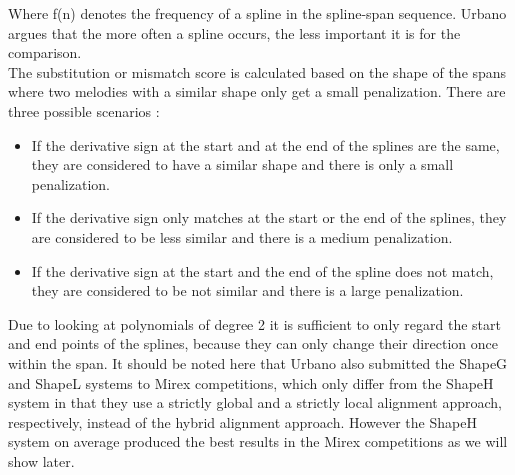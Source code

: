 \documentclass{llncs}
\begin{document}
        Where f(n) denotes the frequency of a spline in the spline-span sequence. Urbano argues that the more often a spline occurs, the less important it is for the comparison. \\
        The substitution or mismatch score is calculated based on the shape of the spans where two melodies with a similar shape only get a small penalization. There are three possible scenarios : 
        \begin{itemize}
         \item If the derivative sign at the start and at the end of the splines are the same, they are considered to have a similar shape and there is only a small penalization.
         \item If the derivative sign only matches at the start or the end of the splines, they are considered to be less similar and there is a medium penalization.
         \item If the derivative sign at the start and the end of the spline does not match, they are considered to be not similar and there is a large penalization.
        \end{itemize}
        Due to looking at polynomials of degree 2 it is sufficient to only regard the start and end points of the splines, because they can only change their direction once within the span.
        It should be noted here that Urbano also submitted the ShapeG and ShapeL systems to Mirex competitions, which only differ from the ShapeH system in that they use a strictly global and a strictly local alignment approach, respectively, instead of the hybrid alignment approach. However the ShapeH system on average produced the best results in the Mirex competitions as we will show later.
  
		
\end{document}
